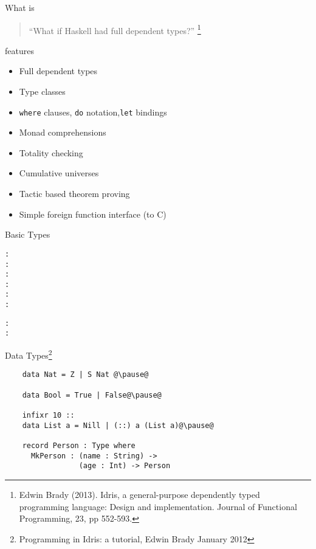 \documentclass[rail]{beamer}
\title{\idris}
\subtitle{A language with dependent types}
\author{Alejandro Gómez Londoño}
\date{17th March, 2014}
\institute{EAFIT University}
\begin{document}
\begin{frame}
  \titlepage
\end{frame}

\begin{frame}{What is \idris}
  \begin{quotation}
    “What if Haskell had full dependent types?”
    \footnote[frame,1]{ Edwin Brady (2013). Idris, a general-purpose
      dependently typed programming language: Design and
      implementation. Journal of Functional Programming, 23, pp
      552-593.}
  \end{quotation}
\end{frame}

\begin{frame}{\idris features}
  \begin{itemize}
    \item Full dependent types
    \item Type classes
    \item \texttt{where} clauses, \texttt{do} notation,\texttt{let} bindings
    \item Monad comprehensions
    \item Totality checking
    \item Cumulative universes
    \item Tactic based theorem proving
    \item Simple foreign function interface (to C)
  \end{itemize}
\end{frame}

\begin{frame}[fragile]{\idris}{Basic Types}
\begin{alltt}

  {\color{red}{Z}} : {\color{blue}{Nat}}
  {\color{red}{50}} : {\color{blue}{Integer}}
  {\color{red}{1.23}} : {\color{blue}{Float}}
  {\color{red}{True}} : {\color{blue}{Bool}}\pause
  {\color{red}{'a'}} : {\color{blue}{Char}}
  {\color{red}{"foo"}} : {\color{blue}{String}}\pause

  {\color{red}{[1,2,3]}} : {\color{blue}{List Integer}}
  {\color{red}{[1,2,3]}} : {\color{blue}{Vect 3 Integer}}
\end{alltt}
\end{frame}

\begin{frame}[fragile]{\idris}
  {Data Types\footnote[frame,1]
    {Programming in Idris: a tutorial, Edwin Brady January 2012}}
  \begin{lstlisting}
    data Nat = Z | S Nat @\pause@

    data Bool = True | False@\pause@

    infixr 10 ::
    data List a = Nill | (::) a (List a)@\pause@

    record Person : Type where
      MkPerson : (name : String) ->
                 (age : Int) -> Person
  \end{lstlisting}
\end{frame}
\end{document}

